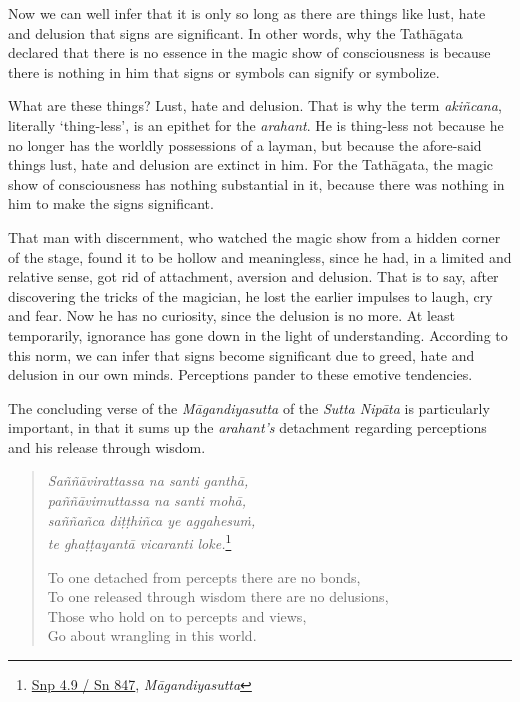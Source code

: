 Now we can well infer that it is only so long as there are things like lust, hate and delusion that signs are significant. In other words, why the Tathāgata declared that there is no essence in the magic show of consciousness is because there is nothing in him that signs or symbols can signify or symbolize.

What are these things? Lust, hate and delusion. That is why the term \emph{akiñcana}, literally `thing-less', is an epithet for the \emph{arahant}. He is thing-less not because he no longer has the worldly possessions of a layman, but because the afore-said things lust, hate and delusion are extinct in him. For the Tathāgata, the magic show of consciousness has nothing substantial in it, because there was nothing in him to make the signs significant.

That man with discernment, who watched the magic show from a hidden corner of the stage, found it to be hollow and meaningless, since he had, in a limited and relative sense, got rid of attachment, aversion and delusion. That is to say, after discovering the tricks of the magician, he lost the earlier impulses to laugh, cry and fear. Now he has no curiosity, since the delusion is no more. At least temporarily, ignorance has gone down in the light of understanding. According to this norm, we can infer that signs become significant due to greed, hate and delusion in our own minds. Perceptions pander to these emotive tendencies.

The concluding verse of the \emph{Māgandiyasutta} of the \emph{Sutta Nipāta} is particularly important, in that it sums up the \emph{arahant's} detachment regarding perceptions and his release through wisdom.

\begin{quote}
\emph{Saññāvirattassa na santi ganthā,}\\
\emph{paññāvimuttassa na santi mohā,}\\
\emph{saññañca diṭṭhiñca ye aggahesuṁ,}\\
\emph{te ghaṭṭayantā vicaranti loke.}\footnote{\href{https://suttacentral.net/snp4.9/pli/ms}{Snp 4.9 / Sn 847}, \emph{Māgandiyasutta}}

To one detached from percepts there are no bonds,\\
To one released through wisdom there are no delusions,\\
Those who hold on to percepts and views,\\
Go about wrangling in this world.
\end{quote}

